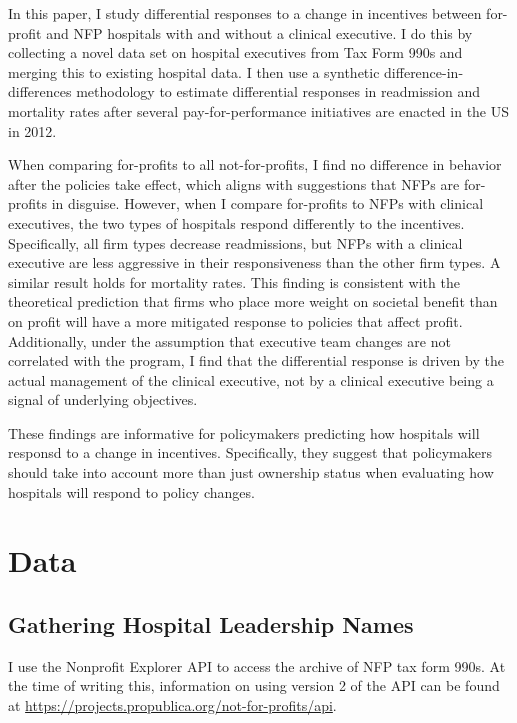 \documentclass[12pt]{article}
\begin{document}
    In this paper, I study differential responses to a change in incentives between for-profit and NFP hospitals with and without a clinical executive. I do this by collecting a novel data set on hospital executives from Tax Form 990s and merging this to existing hospital data. I then use a synthetic difference-in-differences methodology to estimate differential responses in readmission and mortality rates after several pay-for-performance initiatives are enacted in the US in 2012. 
    
     When comparing for-profits to all not-for-profits, I find no difference in behavior after the policies take effect, which aligns with suggestions that NFPs are for-profits in disguise. However, when I compare for-profits to NFPs with clinical executives, the two types of hospitals respond differently to the incentives. Specifically, all firm types decrease readmissions, but NFPs with a clinical executive are less aggressive in their responsiveness than the other firm types. A similar result holds for mortality rates. This finding is consistent with the theoretical prediction that firms who place more weight on societal benefit than on profit will have a more mitigated response to policies that affect profit. Additionally, under the assumption that executive team changes are not correlated with the program, I find that the differential response is driven by the actual management of the clinical executive, not by a clinical executive being a signal of underlying objectives. 
     
     These findings are informative for policymakers predicting how hospitals will responsd to a change in incentives. Specifically, they suggest that policymakers should take into account more than just ownership status when evaluating how hospitals will respond to policy changes. 

	
	\newpage

    \printbibliography

\appendix

 \section{Data}\label{appendixdata}

\subsection{Gathering Hospital Leadership Names}

I use the Nonprofit Explorer API to access the archive of NFP tax form 990s. At the time of writing this, information on using version 2 of the API can be found at \hyperlink{https://projects.propublica.org/not-for-profits/api}{https://projects.propublica.org/not-for-profits/api}. 
    
\end{document}
